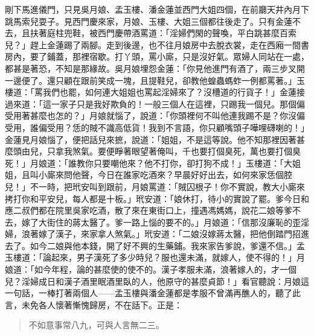 剛下馬進儀門，只見吳月娘、孟玉樓、潘金蓮並西門大姐四個，在前廳天井內月下跳馬索兒耍子。見西門慶來家，月娘、玉樓、大姐三個都往後走了。只有金蓮不去，且扶著庭柱兜鞋，被西門慶帶酒罵道：「淫婦們閑的聲喚，平白跳甚麼百索兒？」趕上金蓮踢了兩腳。走到後邊，也不往月娘房中去脫衣裳，走在西廂一間書房內，要了鋪蓋，那裡宿歇。打丫頭，罵小廝，只是沒好氣。眾婦人同站在一處，都甚是著恐，不知是那緣故。吳月娘埋怨金蓮：「你見他進門有酒了，兩三步叉開一邊便了。還只顧在跟前笑成一塊，且提鞋兒，卻教他蝗蟲螞蚱一例都罵著。」玉樓道：「罵我們也罷，如何連大姐姐也罵起淫婦來了？沒槽道的行貨子！」金蓮接過來道：「這一家子只是我好欺負的！一般三個人在這裡，只踢我一個兒。那個偏受用著甚麼也怎的？」月娘就惱了，說道：「你頭裡何不叫他連我踢不是？你沒偏受用，誰偏受用？恁的賊不識高低貨！我到不言語，你只顧嘴頭子嘩哩礴喇的！」金蓮見月娘惱了，便把話兒來摭，說道：「姐姐，不是這等說。他不知那裡因著甚麼頭由兒，只拿我煞氣。要便睜著眼望著俺叫，千也要打個臭死，萬也要打個臭死！」月娘道：「誰教你只要嘲他來？他不打你，卻打狗不成！」玉樓道：「大姐姐，且叫小廝來問他聲，今日在誰家吃酒來？早晨好好出去，如何來家恁個腔兒！」不一時，把玳安叫到跟前，月娘罵道：「賊囚根子！你不實說，教大小廝來拷打你和平安兒，每人都是十板。」玳安道：「娘休打，待小的實說了罷。爹今日和應二叔們都在院里吳家吃酒，散了來在東街口上，撞遇馮媽媽，說花二娘等爹不去，嫁了大街住的蔣太醫了。爹一路上惱的要不的。」月娘道：「信那沒廉恥的歪淫婦，浪著嫁了漢子，來家拿人煞氣。」玳安道：「二娘沒嫁蔣太醫，把他倒踏門招進去了。如今二娘與他本錢，開了好不興的生藥鋪。我來家告爹說，爹還不信。」孟玉樓道：「論起來，男子漢死了多少時兒？服也還未滿，就嫁人，使不得的！」月娘道：「如今年程，論的甚麼使的使不的。漢子孝服未滿，浪著嫁人的，才一個兒？淫婦成日和漢子酒里眠酒里臥的人，他原守的甚麼貞節！」看官聽說：月娘這一句話，一棒打著兩個人——孟玉樓與潘金蓮都是孝服不曾滿再醮人的，聽了此言，未免各人懷著慚愧歸房，不在話下。正是：
\begin{quote}
不如意事常八九，可與人言無二三。
\end{quote}

